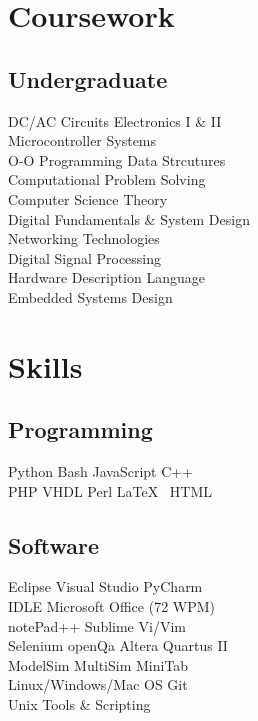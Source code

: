 \documentclass[]{deedy-resume-openfont}
\begin{document}
\begin{minipage}[t]{0.32\textwidth}
\section{Coursework}
\subsection{Undergraduate}
DC/AC Circuits \textbullet{} Electronics I \& II \\
Microcontroller Systems \\
O-O Programming \textbullet{} Data Strcutures \\
Computational Problem Solving \\
Computer Science Theory \\
Digital Fundamentals \& System Design\\
Networking Technologies\\
Digital Signal Processing\\
Hardware Description Language\\
Embedded Systems Design
\sectionsep


\section{Skills}
\subsection{Programming}
Python \textbullet{} Bash \textbullet{} JavaScript \textbullet{} C++ \\
PHP \textbullet{} VHDL \textbullet{} Perl \textbullet{} \LaTeX\ \textbullet{} HTML 
\sectionsep

\subsection{Software}
Eclipse \textbullet{} Visual Studio \textbullet{} PyCharm \\ IDLE \textbullet{} Microsoft Office (72 WPM) \\ notePad++ \textbullet{} Sublime \textbullet{} Vi/Vim \\ Selenium \textbullet{} openQa \textbullet{} Altera Quartus II \\ ModelSim \textbullet{} MultiSim \textbullet{} MiniTab \\ Linux/Windows/Mac OS \textbullet{} Git \\ Unix Tools \& Scripting
\sectionsep


\end{minipage}
\end{document}
